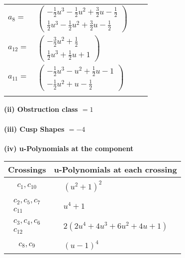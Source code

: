 \documentclass[1p]{elsarticle_modified}
\theoremstyle{definition}
\begin{document}
\begin{tabular}{m{7pt} m{180pt} m{7pt} m{180pt} }
\flushright $a_{8}=$&$\begin{pmatrix}-\frac{1}{2} u^3-\frac{1}{2} u^2+\frac{3}{2} u-\frac{1}{2}\\\frac{1}{2} u^3-\frac{1}{2} u^2+\frac{3}{2} u-\frac{1}{2}\end{pmatrix}$ \\
\flushright $a_{12}=$&$\begin{pmatrix}-\frac{3}{2} u^2+\frac{1}{2}\\\frac{1}{2} u^3+\frac{1}{2} u+1\end{pmatrix}$ \\
\flushright $a_{11}=$&$\begin{pmatrix}-\frac{1}{2} u^3- u^2+\frac{1}{2} u-1\\-\frac{1}{2} u^2+u-\frac{1}{2}\end{pmatrix}$\\&\end{tabular}
\flushleft \textbf{(ii) Obstruction class $= 1$}\\~\\
\flushleft \textbf{(iii) Cusp Shapes $= -4$}\\~\\
\newpage\renewcommand{\arraystretch}{1}
\flushleft \textbf{(iv) u-Polynomials at the component}\newline \\
\begin{tabular}{m{50pt}|m{274pt}}
Crossings & \hspace{64pt}u-Polynomials at each crossing \\
\hline $$\begin{aligned}c_{1},c_{10}\end{aligned}$$&$\begin{aligned}
&(u^2+1)^2
\end{aligned}$\\
\hline $$\begin{aligned}c_{2},c_{5},c_{7}\\c_{11}\end{aligned}$$&$\begin{aligned}
&u^4+1
\end{aligned}$\\
\hline $$\begin{aligned}c_{3},c_{4},c_{6}\\c_{12}\end{aligned}$$&$\begin{aligned}
&2(2 u^4+4 u^3+6 u^2+4 u+1)
\end{aligned}$\\
\hline $$\begin{aligned}c_{8},c_{9}\end{aligned}$$&$\begin{aligned}
&(u-1)^4
\end{aligned}$\\
\hline
\end{tabular}\\~\\
\end{document}
